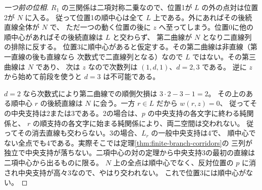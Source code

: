 \begin{proof}[一つ前の位相]
$R_1$ の三関係は二項対称二乗なので、位置1が $L$ の外の点対は位置2が $N$ に入る。
従って位置1の順中心は全て $L$ 上である。外にあればその後続直線全体が $N$ で、
ただ一つの動く位置の後に $z$ へ至ってしまう。位置0に他の順中心があればその後続直線は $L$ と交わらず、
第二曲線が $N$ となり二直線列の排除に反する。
位置3に順中心があると仮定する。その第二曲線は非直線（第一直線の後も直線なら
次数式で二直線列となる）なので $L$ ではない。その第三曲線は $N$ であり、
次は $z$ なので次数列は $(1,d,1)$、$d=2,3$ である。
逆に $z$ から始めて前段を使うと $d=3$ は不可能である。

$d=2$ なら次数式により第二曲線での順側欠損は $3\cdot2-3-1=2$。
その上のある順中心 $r$ の後続直線は $N$ に会う。一方 $r\in L$ だから $w(r,z)=0$、
従ってその中央支持は2または3である。2の場合は、$p$ の中央支持の各文字に終わる純関係と、
$r$ の順支持の各文字に始まる純関係により、両二空間は交われない。
従ってその消去直線も交わらない。3の場合、$L_r$ の一般中央支持は4で、
順中心でない全点でも4である。実際そこでは定理\ref{thm:finite-branch-corridors}の
三列が独立で中央支持が落ちない。二項中心の対の定理から中央支持3の最初の直線は二項中心から出るものに限る。
$N$ 上の全点は順中心でなく、反対位置の $p$ に消され中央支持が高々3なので、やはり交われない。
これで位置3には順中心がない。
\end{proof}

